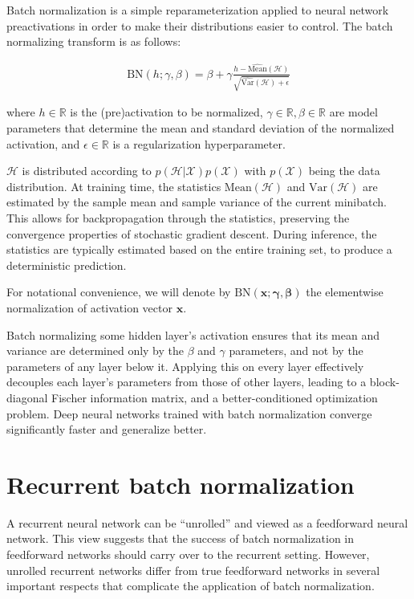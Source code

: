 \documentclass{article} %
\newcommand{\vect}[1]{\mathbf{#1}}
\newcommand{\reals}{\mathbb{R}}
\begin{document}
Batch normalization is a simple reparameterization applied to neural network preactivations in order to make their distributions easier to control.
The batch normalizing transform is as follows:

\begin{align}
\mathrm{BN}(h; \gamma, \beta) =
  \beta + \gamma
  \frac{h -   \widehat{\mathrm{Mean}}(\mathcal{H})}
       {\sqrt{\widehat{\mathrm{Var }}(\mathcal{H}) + \epsilon}}
\end{align}

where $h \in \reals$ is the (pre)activation to be normalized, $\gamma \in \reals, \beta \in \reals$ are model parameters that determine the mean and standard deviation of the normalized activation, and $\epsilon \in \reals$ is a regularization hyperparameter.

$\mathcal{H}$ is distributed according to $p(\mathcal{H}|\mathcal{X}) p(\mathcal{X})$ with $p(\mathcal{X})$ being the data distribution.
At training time, the statistics $\mathrm{Mean}(\mathcal{H})$ and $\mathrm{Var}(\mathcal{H})$ are estimated by the sample mean and sample variance of the current minibatch.
This allows for backpropagation through the statistics, preserving the convergence properties of stochastic gradient descent.
During inference, the statistics are typically estimated based on the entire training set, to produce a deterministic prediction.

For notational convenience, we will denote by $\mathrm{BN}(\vect{x}; \vect{\gamma}, \vect{\beta})$ the elementwise normalization of activation vector $\vect{x}$.

Batch normalizing some hidden layer's activation ensures that its mean and variance are determined only by the $\beta$ and $\gamma$ parameters, and not by the parameters of any layer below it.
Applying this on every layer effectively decouples each layer's parameters from those of other layers, leading to a block-diagonal Fischer information matrix, and a better-conditioned optimization problem.
Deep neural networks trained with batch normalization converge significantly faster and generalize better.

\section{Recurrent batch normalization}

A recurrent neural network can be ``unrolled'' and viewed as a feedforward neural network.
This view suggests that the success of batch normalization in feedforward networks should carry over to the recurrent setting.
However, unrolled recurrent networks differ from true feedforward networks in several important respects that complicate the application of batch normalization.
\end{document}
